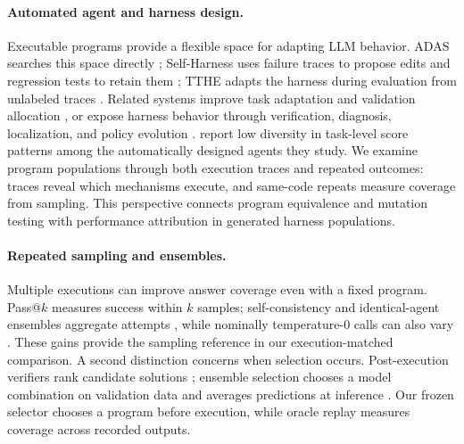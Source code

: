 \paragraph{Automated agent and harness design.}
Executable programs provide a flexible space for adapting LLM behavior.
ADAS searches this space directly \citep{adas2024}; Self-Harness uses
failure traces to propose edits and regression tests to retain them
\citep{selfharness2026}; TTHE adapts the harness during evaluation from
unlabeled traces \citep{tthe2026}. Related systems improve task
adaptation and validation allocation \citep{jitagent2026,coevolve2026},
or expose harness behavior through verification, diagnosis, localization,
and policy evolution
\citep{harnesslens2026,harnessfix2026,ahe2026,gatedqd2026,handbook2026,harnessforge2026}.
\citet{metaagents2025} report low diversity in task-level score patterns
among the automatically designed agents they study. We examine program
populations through both execution traces and repeated outcomes:
traces reveal which mechanisms execute, and same-code repeats measure
coverage from sampling. This perspective connects program equivalence
and mutation testing \citep{budd1982,papadakis2019} with performance
attribution in generated harness populations.

\paragraph{Repeated sampling and ensembles.}
Multiple executions can improve answer coverage even with a fixed
program. Pass@$k$ measures success within $k$ samples; self-consistency
and identical-agent ensembles aggregate attempts
\citep{chen2021codex,selfconsistency2022,moreagents2024}, while nominally
temperature-$0$ calls can also vary \citep{nondeterminism2023}. These
gains provide the sampling reference in our execution-matched
comparison. A second distinction concerns when selection occurs.
Post-execution verifiers rank candidate solutions \citep{llmverifier2026};
ensemble selection chooses a model combination on validation data and
averages predictions at inference \citep{caruana2004}. Our frozen
selector chooses a program before execution, while oracle replay
measures coverage across recorded outputs.


